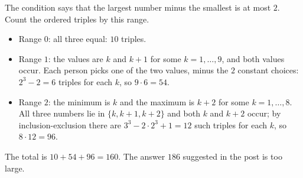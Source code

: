 The condition says that the largest number minus the smallest is at most $2$. Count the ordered triples by this range.
\begin{itemize}
\item Range $0$: all three equal: $10$ triples.
\item Range $1$: the values are $k$ and $k+1$ for some $k=1,\dots,9$, and both values occur. Each person picks one of the two values, minus the $2$ constant choices: $2^3-2=6$ triples for each $k$, so $9\cdot6=54$.
\item Range $2$: the minimum is $k$ and the maximum is $k+2$ for some $k=1,\dots,8$. All three numbers lie in $\{k,k+1,k+2\}$ and both $k$ and $k+2$ occur; by inclusion-exclusion there are $3^3-2\cdot2^3+1=12$ such triples for each $k$, so $8\cdot12=96$.
\end{itemize}
The total is $10+54+96=\boxed{160}$. The answer $186$ suggested in the post is too large.
